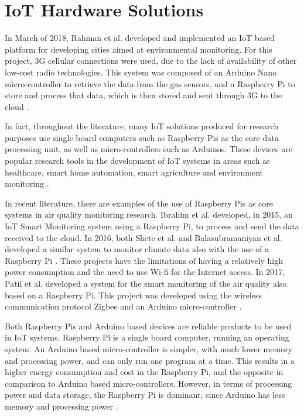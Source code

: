 \section{IoT Hardware Solutions}

In March of 2018, Rahman et al. developed and implemented an IoT based platform for developing cities aimed at environmental monitoring. For this project, 3G cellular connections were used, due to the lack of availability of other low-cost radio technologies. This system was composed of an Arduino Nano micro-controller to retrieve the data from the gas sensors, and a Raspberry Pi to store and process that data, which is then stored and sent through 3G to the cloud \cite{Rahman2018}.

In fact, throughout the literature, many IoT solutions produced for research purposes use single board computers such as Raspberry Pis as the core data processing unit, as well as micro-controllers such as Arduinos. These devices are popular research tools in the development of IoT systems in areas such as healthcare, smart home automation, smart agriculture and environment monitoring \cite{Rahman2018}. 

In recent literature, there are examples of the use of Raspberry Pis as core systems in air quality monitoring research. Ibrahim et al. developed, in 2015, an IoT Smart Monitoring system using a Raspberry Pi, to process and send the data received to the cloud. In 2016, both Shete et al. and Balasubramaniyan et al. developed a similar system to monitor climate data also with the use of a Raspberry Pi \cite{Shete2016} \cite{Balasubramaniyan2016}. These projects have the limitations of having a relatively high power consumption and the need to use Wi-fi for the Internet access. In 2017, Patil et al. developed a system for the smart monitoring of the air quality also based on a Raspberry Pi. This project was developed using the wireless communication protocol Zigbee and an Arduino micro-controller \cite{Patil2017}.

Both Raspberry Pis and Arduino based devices are reliable products to be used in IoT systems. Raspberry Pi is a single board computer, running an operating system. An Arduino based micro-controller is simpler, with much lower memory and processing power, and can only run one program at a time. This results in a higher energy consumption and cost in the Raspberry Pi, and the opposite in comparison to Arduino based micro-controllers. However, in terms of processing power and data storage, the Raspberry Pi is dominant, since Arduino has less memory and processing power \cite{Balasubramaniyan2016}.

